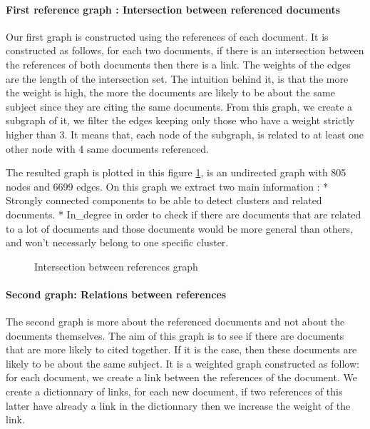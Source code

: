 \documentclass[article,twocolumn]{IEEEtran}
\begin{document}
    \hypertarget{first-reference-graph-intersection-between-referenced-documents}{%
\paragraph{First reference graph : Intersection between referenced
documents}\label{first-reference-graph-intersection-between-referenced-documents}}

Our first graph is constructed using the references of each document. It
is constructed as follows, for each two documents, if there is an
intersection between the references of both documents then there is a
link. The weights of the edges are the length of the intersection set.
The intuition behind it, is that the more the weight is high, the more
the documents are likely to be about the same subject since they are
citing the same documents. From this graph, we create a subgraph of it,
we filter the edges keeping only those who have a weight strictly higher
than 3. It means that, each node of the subgraph, is related to at least
one other node with 4 same documents referenced.



    The resulted graph is plotted in this figure \ref{intersection}, is an
undirected graph with 805 nodes and 6699 edges. On this graph we extract
two main information : * Strongly connected components to be able to
detect clusters and related documents. * In\_degree in order to check if
there are documents that are related to a lot of documents and those
documents would be more general than others, and won't necessarly belong
to one specific cluster.


    \begin{figure}
        \begin{center}\end{center}
        \caption{Intersection between references graph}
        \label{intersection}
    \end{figure}
    
    \hypertarget{second-graph-relations-between-references}{%
\paragraph{Second graph: Relations between
references}\label{second-graph-relations-between-references}}

The second graph is more about the referenced documents and not about
the documents themselves. The aim of this graph is to see if there are
documents that are more likely to cited together. If it is the case,
then these documents are likely to be about the same subject. It is a
weighted graph constructed as follow: for each document, we create a
link between the references of the document. We create a dictionnary of
links, for each new document, if two references of this latter have
already a link in the dictionnary then we increase the weight of the
link.
\end{document}
